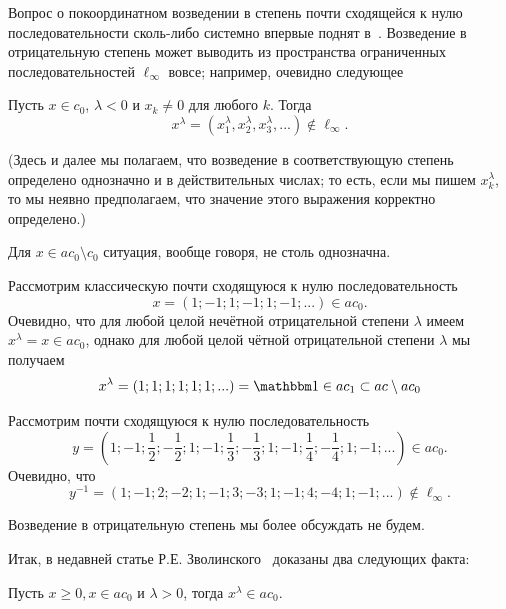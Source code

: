 Вопрос о покоординатном возведении в степень почти сходящейся к нулю последовательности сколь-либо системно впервые поднят в~\cite{zvol2022ac}.
Возведение в отрицательную степень может выводить из пространства ограниченных последовательностей $\ell_\infty$ вовсе;
например, очевидно следующее
\begin{proposition}
	Пусть $x\in c_0$, $\lambda< 0$ и $x_k\ne 0 $ для любого $k$.
	Тогда
	\begin{equation*}
		x^\lambda = (x_1^\lambda,x_2^\lambda,x_3^\lambda,...) \notin \ell_\infty
		.
	\end{equation*}
\end{proposition}
(Здесь и далее мы полагаем, что возведение в соответствующую степень определено однозначно и в действительных числах;
то есть, если мы пишем $x_k^\lambda$, то мы неявно предполагаем, что значение этого выражения корректно определено.)


Для $x\in ac_0\setminus c_0$ ситуация, вообще говоря, не столь однозначна.

\begin{example}
	\label{example:ac0_pow_signum_classic}
	Рассмотрим классическую почти сходящуюся к нулю последовательность
	\begin{equation}
		x = (1;-1;1;-1;1;-1;...) \in ac_0
		.
	\end{equation}
	Очевидно, что для любой целой нечётной отрицательной степени $\lambda$ имеем $x^\lambda = x \in ac_0$,
	однако для любой целой чётной отрицательной степени $\lambda$ мы получаем
	\begin{equation}
		x^\lambda = (1;1;1;1;1;1;...) = \one \in ac_1 \subset ac \setminus ac_0
	\end{equation}
\end{example}

\begin{example}
	Рассмотрим почти сходящуюся к нулю последовательность
	\begin{equation}
		y = \left(1;-1;\frac12;-\frac12;1;-1;\frac13;-\frac13;1;-1;\frac14;-\frac14;1;-1;...\right) \in ac_0
		.
	\end{equation}
	Очевидно, что
	\begin{equation}
		y^{-1} = \left(1;-1;2;-2;1;-1;3;-3;1;-1;4;-4;1;-1;...\right)  \notin \ell_\infty
		.
	\end{equation}
\end{example}

Возведение в отрицательную степень мы более обсуждать не будем.

Итак, в недавней статье Р.Е. Зволинского~\cite{zvol2022ac} доказаны два следующих факта:
\begin{theorem}
	\label{thm:Zvol_pow_pos}
	Пусть $x \geqslant 0, x \in a c_0$ и $\lambda>0$, тогда $x^\lambda \in a c_0$.
\end{theorem}

